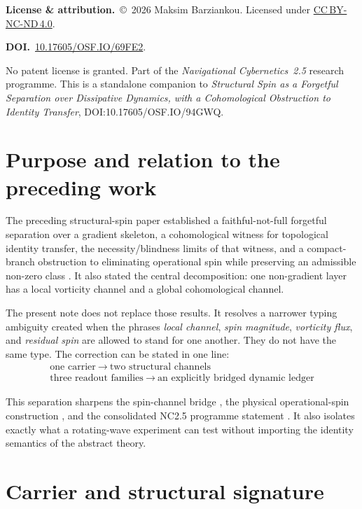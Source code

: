\documentclass[11pt]{article}
\theoremstyle{definition}
\begin{document}
\bigskip
\noindent\footnotesize
\textbf{License \& attribution.}\ \copyright~2026 Maksim Barziankou.
Licensed under
\href{https://creativecommons.org/licenses/by-nc-nd/4.0/}{CC\,BY-NC-ND\,4.0}.
\par\smallskip
\noindent\textbf{DOI.}\ \href{https://doi.org/10.17605/OSF.IO/69FE2}{10.17605/OSF.IO/69FE2}.
\par\smallskip
\noindent No patent license is granted.  Part of the
\emph{Navigational Cybernetics~2.5} research programme.  This is a
standalone companion to \emph{Structural Spin as a Forgetful Separation
over Dissipative Dynamics, with a Cohomological Obstruction to Identity
Transfer}, DOI:10.17605/OSF.IO/94GWQ.
\normalsize
\bigskip

\section{Purpose and relation to the preceding work}

The preceding structural-spin paper established a faithful-not-full
forgetful separation over a gradient skeleton, a cohomological witness
for topological identity transfer, the necessity/blindness limits of that
witness, and a compact-branch obstruction to eliminating operational
spin while preserving an admissible non-zero class
\cite{structural}.  It also stated the central decomposition: one
non-gradient layer has a local vorticity channel and a global
cohomological channel.

The present note does not replace those results.  It resolves a narrower
typing ambiguity created when the phrases \emph{local channel},
\emph{spin magnitude}, \emph{vorticity flux}, and \emph{residual spin}
are allowed to stand for one another.  They do not have the same type.
The correction can be stated in one line:
\[
\boxed{\begin{gathered}
\text{one carrier}\ \longrightarrow\ \text{two structural channels}\\[-1pt]
\text{three readout families}\ \longrightarrow\ \text{an explicitly bridged dynamic ledger}
\end{gathered}}
\]

This separation sharpens the spin-channel bridge \cite{bridge}, the
physical operational-spin construction \cite{operational}, and the
consolidated NC2.5 programme statement \cite{nc25}.  It also isolates
exactly what a rotating-wave
experiment can test without importing the identity semantics of the
abstract theory.

\section{Carrier and structural signature}
\end{document}
